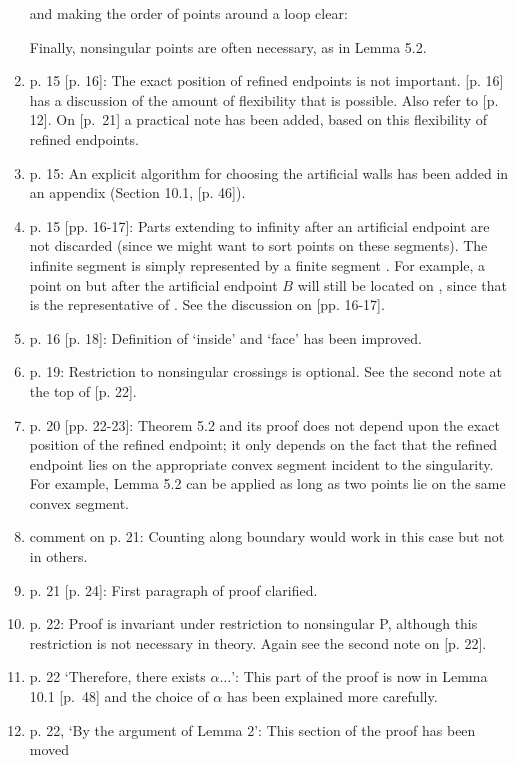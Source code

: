 \begin{letter}
\begin{enumerate}
	and making the order of points around a loop clear:\\
	\vspace{2in}

	Finally, nonsingular points are often necessary, as in Lemma 5.2.
\item	
	p. 15 [p. 16]: The exact position of refined endpoints is not important.
	[p. 16] has a discussion of the amount of flexibility that is possible.
	Also refer to [p. 12].
	On \mbox{[p. 21]} a practical note has been added, based on this flexibility of refined 
	endpoints.
\item
	p. 15: An explicit algorithm for choosing the artificial walls has been added in 
	an appendix (Section 10.1, [p. 46]).
\item
	p. 15 [pp. 16-17]: Parts extending to infinity after an artificial endpoint
	are not discarded (since we might want to sort points on these segments).
	The infinite segment  is simply represented by a finite segment 
	.  For example, a point on  but after the artificial
	endpoint $B$ will still be located on , 
	since that is the representative of .
	See the discussion on [pp. 16-17].
\item
	p. 16 [p. 18]: Definition of `inside' and `face' has been improved.
\item
	p. 19: 	Restriction to nonsingular crossings is optional.
		See the second note at the top of [p. 22].
\item
	p. 20 [pp. 22-23]:  Theorem 5.2 and its proof does not depend upon the exact position
	of the refined endpoint; it only depends on the fact that the refined endpoint
	lies on the appropriate convex segment incident to the singularity.
	For example, Lemma 5.2 can be applied as long as two points lie on the same convex 
	segment.
\item	
	comment on p. 21: Counting along boundary would work in this case
	but not in others.
\item
	p. 21 [p. 24]: First paragraph of proof clarified.
\item
	p. 22: Proof is invariant under restriction to nonsingular P, although
	this restriction is not necessary in theory. 
	Again see the second note on [p. 22]. 
\item
	p. 22 `Therefore, there exists $\alpha \ldots$': 
	This part of the proof is now in Lemma 10.1 \mbox{[p. 48]} and the choice of $\alpha$
	has been explained more carefully.
\item
	p. 22, `By the argument of Lemma 2': This section of the proof has been moved

\end{enumerate}
\end{letter}
